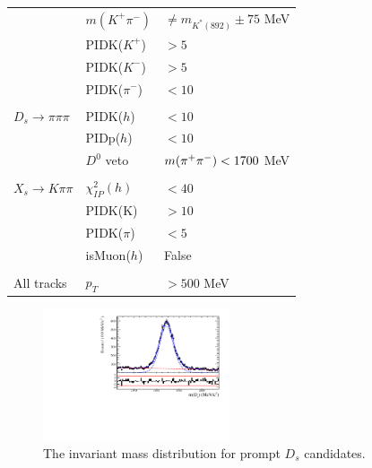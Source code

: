 \begin{table}[h]
\begin{tabular}{l l l}
& $m(K^+\pi^-)$  & $\ne m_{K^{*}(892)} \pm 75$ MeV \\
& PIDK($K^+$) & $> 5$ \\
& PIDK($K^-$) & $> 5$ \\
& PIDK($\pi^-$) & $< 10$ \\
\\
$D_s \to \pi \pi \pi$ & PIDK($h$) & $< 10$  \\
& PIDp($h$) & $< 10$ \\
& $D^0$ veto  & $m({{\pi}^+} {{\pi}^-}) < 1700$ MeV \\
\\
$X_s \to K \pi \pi$  &  $\chi^{2}_{IP}(h)$ &  $< 40$ \\
& PIDK(K) & $> 10$ \\
& PIDK($\pi$) & $< 5$ \\
& isMuon($h$) & False \\
\\
All tracks  & $p_T$ & $> 500$ MeV \\

\hline
\hline
\end{tabular}
\label{table:fakeBsel}
\end{table}

\begin{figure}[h]
\centering
\includegraphics[height=!,width=0.49\textwidth]{figs/Resolution/Ds_M_pull.pdf}
\caption{The invariant mass distribution for prompt $D_s$ candidates. }
\label{fig:ResoFit_Ds}
\end{figure}

